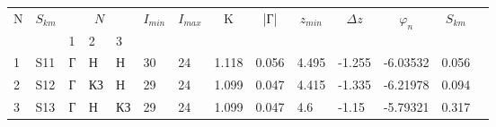 
\begin{tabular}{|l|l|l|l|l|l|l|l|l|l|l|l|l|l}
\cline{1-13}
\multicolumn{1}{|c|}{\multirow{2}{*}{N}} & \multicolumn{1}{c|}{\multirow{2}{*}{$S_{km}$}} & \multicolumn{3}{c|}{$N_{}$} & \multicolumn{1}{c|}{\multirow{2}{*}{$I_{min}$}} & \multicolumn{1}{c|}{\multirow{2}{*}{$I_{max}$}} & \multicolumn{1}{c|}{\multirow{2}{*}{K}} & \multicolumn{1}{c|}{\multirow{2}{*}{|Г|}} & \multicolumn{1}{c|}{\multirow{2}{*}{$z_{min}$}} & \multicolumn{1}{c|}{\multirow{2}{*}{$\Delta z$}} & \multicolumn{1}{c|}{\multirow{2}{*}{$\varphi_n$}} & \multicolumn{1}{c|}{\multirow{2}{*}{$S_{km}$}} &  \\ \cline{3-5}
\multicolumn{1}{|c|}{}                   & \multicolumn{1}{c|}{}                          & 1      & 2       & 3      & \multicolumn{1}{c|}{}                           & \multicolumn{1}{c|}{}                           & \multicolumn{1}{c|}{}                   & \multicolumn{1}{c|}{}                     & \multicolumn{1}{c|}{}                           & \multicolumn{1}{c|}{}                            & \multicolumn{1}{c|}{}                             & \multicolumn{1}{c|}{}                          &  \\ \cline{1-13}
1                                        & S11                                            & Г      & Н       & Н      & 30                                              & 24                                              & 1.118                                   & 0.056                                     & 4.495                                           & -1.255                                           & -6.03532                                          & 0.056                                          &  \\ \cline{1-13}
2                                        & S12                                            & Г      & КЗ      & Н      & 29                                              & 24                                              & 1.099                                   & 0.047                                     & 4.415                                           & -1.335                                           & -6.21978                                          & 0.094                                          &  \\ \cline{1-13}
3                                        & S13                                            & Г      & Н       & КЗ     & 29                                              & 24                                              & 1.099                                   & 0.047                                     & 4.6                                             & -1.15                                            & -5.79321                                          & 0.317                                          &  \\ \cline{1-13}

\end{tabular}
